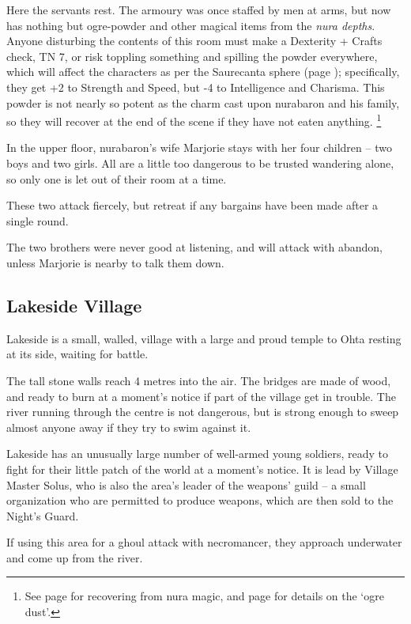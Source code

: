 \begin{multicols}{2}
\nurabaron


Here the servants rest.
The armoury was once staffed by men at arms, but now has nothing but ogre-powder and other magical items from the \textit{nura depths}.
Anyone disturbing the contents of this room must make a Dexterity + Crafts check, TN 7, or risk toppling something and spilling the powder everywhere, which will affect the characters as per the Saurecanta sphere (page \pageref{saurecanta}); specifically, they get +2 to Strength and Speed, but -4 to Intelligence and Charisma.
This powder is not nearly so potent as the charm cast upon \gls{nurabaron} and his family, so they will recover at the end of the scene if they have not eaten anything.
\footnote{See page \pageref{nura_recovery} for recovering from nura magic, and page \pageref{ogredust} for details on the `ogre dust'.}


In the upper floor, \gls{nurabaron}'s wife Marjorie stays with her four children -- two boys and two girls.  All are a little too dangerous to be trusted wandering alone, so only one is let out of their room at a time.


These two attack fiercely, but retreat if any bargains have been made after a single round.


The two brothers were never good at listening, and will attack with abandon, unless Marjorie is nearby to talk them down.

\subsection{Lakeside Village}


Lakeside is a small, walled, village with a large and proud temple to Ohta resting at its side, waiting for battle.

The tall stone walls reach 4 metres into the air.
The bridges are made of wood, and ready to burn at a moment's notice if part of the village get in trouble.
The river running through the centre is not dangerous, but is strong enough to sweep almost anyone away if they try to swim against it.

Lakeside has an unusually large number of well-armed young soldiers, ready to fight for their little patch of the world at a moment's notice.
It is lead by Village Master Solus, who is also the area's leader of the weapons' guild -- a small organization who are permitted to produce weapons, which are then sold to the Night's Guard.

\label{solus}

If using this area for a ghoul attack with \gls{necromancer}, they approach underwater and come up from the river.


\end{multicols}

